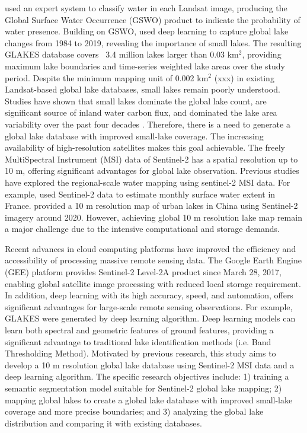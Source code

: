 \documentclass[preprint,12pt,authoryear]{elsarticle}
\begin{document}
\citet{pekel_high-resolution_2016} used an expert system to classify water in each Landsat image, producing the Global Surface Water Occurrence (GSWO) product to indicate the probability of water presence. Building on GSWO, \citet{pi_mapping_2022} used deep learning to capture global lake changes from 1984 to 2019, revealing the importance of small lakes. The resulting GLAKES database covers ~3.4 million lakes larger than 0.03 km$^2$, providing maximum lake boundaries and time-series weighted lake areas over the study period. 
Despite the minimum mapping unit of 0.002 km$^2$ (xxx) in existing Landsat-based global lake databases, small lakes remain poorly understood. Studies have shown that small lakes dominate the global lake count, are significant source of inland water carbon flux, and dominated the lake area variability over the past four decades \citep{holgerson_large_2016,pi_mapping_2022}. Therefore, there is a need to generate a global lake database with improved small-lake coverage. The increasing availability of high-resolution satellites makes this goal achievable. The freely MultiSpectral Instrument (MSI) data of Sentinel-2 has a spatial resolution up to 10 m, offering significant advantages for global lake observation. Previous studies have explored the regional-scale water mapping using sentinel-2 MSI data. For example, \citet{yang_monthly_2020} used Sentinel-2 data to estimate monthly surface water extent in France. \citet{song_high-resolution_2022} provided a 10 m resolution map of urban lakes in China using Sentinel-2 imagery around 2020. However, achieving global 10 m resolution lake map remain a major challenge due to the intensive computational and storage demands.

Recent advances in cloud computing platforms have improved the efficiency and accessibility of processing massive remote sensing data. The Google Earth Engine (GEE) platform provides Sentinel-2 Level-2A product since March 28, 2017, enabling global satellite image processing with reduced local storage requirement. In addition, deep learning with its high accuracy, speed, and automation, offers significant advantages for large-scale remote sensing observations. For example, GLAKES were generated by deep learning algorithm. Deep learning models can learn both spectral and geometric features of ground features, providing a significant advantage to traditional lake identification methods (i.e. Band Thresholding Method).
Motivated by previous research, this study aims to develop a 10 m resolution global lake database using Sentinel-2 MSI data and a deep learning algorithm. The specific research objectives include: 1) training a semantic segmentation model suitable for Sentinel-2 global lake mapping; 2) mapping global lakes to create a global lake database with improved small-lake coverage and more precise boundaries; and 3) analyzing the global lake distribution and comparing it with existing databases.
\end{document}

